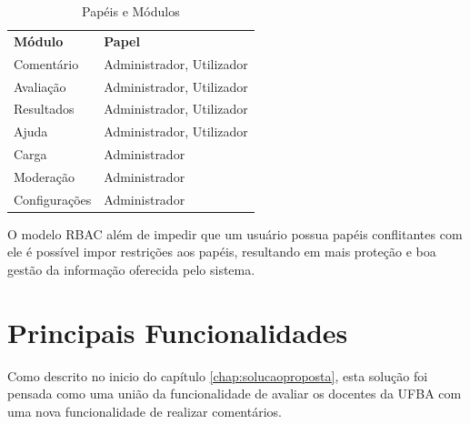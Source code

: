 \documentclass[12pt, a4paper]{report}
\begin{document}
\begin{table}
 \centering
 {\renewcommand\arraystretch{1.25}
 
 \begin{tabular}{ l l }
  \cline{1-1}\cline{2-2}  
    \multicolumn{1}{|p{3.850cm}|}{\textbf{Módulo} \centering } &
    \multicolumn{1}{p{7.217cm}|}{\textbf{Papel} \centering }
  \\  
  \cline{1-1}\cline{2-2}  
    \multicolumn{1}{|p{3.850cm}|}{Comentário} &
    \multicolumn{1}{p{6.217cm}|}{Administrador, Utilizador}
  \\  
  \cline{1-1}\cline{2-2}  
    \multicolumn{1}{|p{3.850cm}|}{Avaliação} &
    \multicolumn{1}{p{6.217cm}|}{Administrador, Utilizador}
  \\  
    \cline{1-1}\cline{2-2}  
    \multicolumn{1}{|p{3.850cm}|}{Resultados} &
    \multicolumn{1}{p{6.217cm}|}{Administrador, Utilizador}
  \\  
    \cline{1-1}\cline{2-2}  
    \multicolumn{1}{|p{3.850cm}|}{Ajuda} &
    \multicolumn{1}{p{6.217cm}|}{Administrador, Utilizador}
  \\  
    \cline{1-1}\cline{2-2}  
    \multicolumn{1}{|p{3.850cm}|}{Carga} &
    \multicolumn{1}{p{6.217cm}|}{Administrador}
  \\  
    \cline{1-1}\cline{2-2}  
    \multicolumn{1}{|p{3.850cm}|}{Moderação} &
    \multicolumn{1}{p{6.217cm}|}{Administrador}
  \\  
    \cline{1-1}\cline{2-2}  
    \multicolumn{1}{|p{3.850cm}|}{Configurações} &
    \multicolumn{1}{p{6.217cm}|}{Administrador}
  \\  
  \hline
 \end{tabular} }
 \caption{Papéis e Módulos}
 \label{tab:papelmod}
\end{table}

O modelo RBAC além de impedir que um usuário possua papéis conflitantes com ele é possível impor restrições aos papéis, resultando em mais proteção e boa gestão da informação oferecida pelo sistema.

\section{ Principais Funcionalidades}

Como descrito no inicio do capítulo \ref{chap:solucaoproposta}, esta solução foi pensada como uma união da funcionalidade de avaliar os docentes da UFBA com uma nova funcionalidade de realizar comentários.
\end{document}
